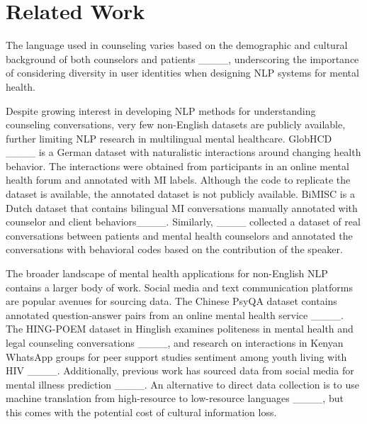 \section{Related Work}
The language used in counseling varies based on the demographic and cultural background of both counselors and patients ____, underscoring the importance of considering diversity in user identities when designing NLP systems for mental health. 


Despite growing interest in developing NLP methods for understanding counseling conversations, very few non-English datasets are publicly available, further limiting NLP research in multilingual mental healthcare. GlobHCD
____
is a German dataset with naturalistic interactions around changing health behavior. The interactions were obtained from participants in an online mental health forum and annotated with MI labels. Although the code to replicate the dataset is available, the annotated dataset is not publicly available.
BiMISC is a Dutch dataset that contains bilingual MI conversations manually annotated with counselor and client behaviors____. Similarly,  ____ collected a dataset of real conversations between patients and mental health counselors and annotated the conversations with behavioral codes based on the contribution of the speaker.%

The broader landscape of mental health applications for non-English NLP contains a larger body of work. Social media and text communication platforms are popular avenues for sourcing data.
The Chinese PsyQA dataset contains annotated question-answer pairs from an online mental health service ____. The HING-POEM dataset in Hinglish examines politeness in mental health and legal counseling conversations ____, and research on interactions in Kenyan WhatsApp groups for peer support studies sentiment among youth living with HIV ____. Additionally, previous work  has sourced data from social media for mental illness prediction ____. 
An alternative to direct data collection  is to use machine translation from high-resource to low-resource languages ____, but this comes with the potential cost of cultural information loss.


